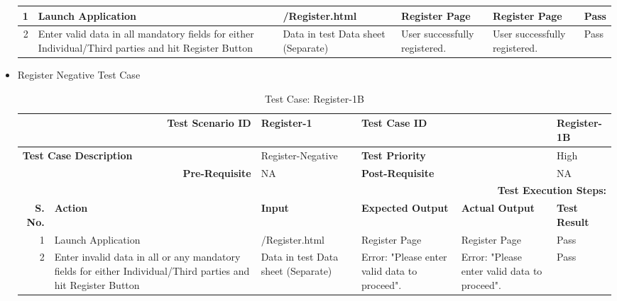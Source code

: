 \documentclass[a4paper, hidelinks, 12pt]{report}
\begin{document}
\begin{itemize}
\begin{table}[H]
\begin{tabular}{|r|p{5.355em}|p{7.715em}|p{6.43em}|p{5.855em}|p{5.07em}|}
    \midrule
    1     & Launch Application & \textcolor[rgb]{ .02,  .388,  .757}{/Register.html} & Register Page & Register Page & Pass \\
    \midrule
    2     & Enter valid data in all mandatory fields for either Individual/Third parties and hit Register Button & Data in test Data sheet (Separate) & User successfully registered. & User successfully registered. & Pass \\
    \bottomrule
    \end{tabular}%
  \label{tab:Test Case: Register-1A}%
\end{table}%
\item{Register Negative Test Case}
\begin{table}[H]
  \centering
  \caption{Test Case: Register-1B}
    \begin{tabular}{|r|p{4.355em}|p{7.715em}|p{6.43em}|p{5.855em}|p{5.07em}|}
    \toprule
    \multicolumn{2}{|p{13.425em}|}{\textbf{Test Scenario ID}} & Register-1 & \multicolumn{2}{p{12.285em}|}{\textbf{Test Case ID}} & Register-1B \\
    \midrule
    \multicolumn{2}{|l|}{\multirow{2}[2]{*}{\textbf{Test Case Description}}} & \multirow{2}[2]{*}{Register-Negative} & \multicolumn{2}{l|}{\multirow{2}[2]{*}{\textbf{Test Priority}}} & \multirow{2}[2]{*}{High} \\
    \multicolumn{2}{|l|}{} & \multicolumn{1}{l|}{} & \multicolumn{2}{l|}{} & \multicolumn{1}{l|}{} \\
    \midrule
    \multicolumn{2}{|p{13.425em}|}{\textbf{Pre-Requisite}} & NA    & \multicolumn{2}{p{12.285em}|}{\textbf{Post-Requisite}} & NA \\
    \midrule
    \multicolumn{6}{p{38.495em}|}{\textbf{Test Execution Steps:}} \\
    \midrule
    \multicolumn{1}{|p{5.07em}|}{\textbf{S. No.}} & \textbf{Action } & \textbf{Input} & \textbf{Expected Output} & \textbf{Actual Output} & \textbf{Test Result} \\
    \midrule
    1     & Launch Application & \textcolor[rgb]{ .02,  .388,  .757}{/Register.html} & Register Page & Register Page & Pass \\
    \midrule
    2     & Enter invalid data in all or any mandatory fields for either Individual/Third parties and hit Register Button & Data in test Data sheet (Separate) & Error: "Please enter valid data to proceed". & Error: "Please enter valid data to proceed". & Pass \\

\end{tabular}
\end{table}
\end{itemize}
\end{document}
